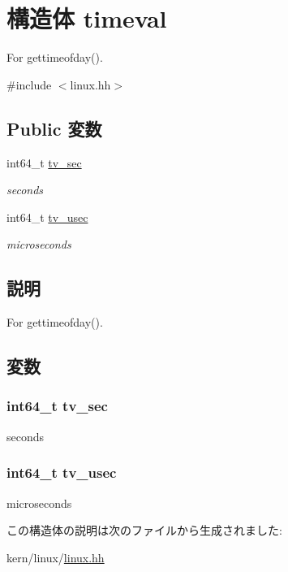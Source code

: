 \hypertarget{structLinux_1_1timeval}{
\section{構造体 timeval}
\label{structLinux_1_1timeval}
}


For gettimeofday().  


{\ttfamily \#include $<$linux.hh$>$}\subsection*{Public 変数}
\begin{DoxyCompactItemize}
\item 
int64\_\-t \hyperlink{structLinux_1_1timeval_ade91ea7e70df7db611d15bdda30a6dd9}{tv\_\-sec}
\begin{DoxyCompactList}\small\item\em seconds \item\end{DoxyCompactList}\item 
int64\_\-t \hyperlink{structLinux_1_1timeval_a73863c3643de3f79fefa8b4d6d3cfaa8}{tv\_\-usec}
\begin{DoxyCompactList}\small\item\em microseconds \item\end{DoxyCompactList}\end{DoxyCompactItemize}


\subsection{説明}
For gettimeofday(). 

\subsection{変数}
\hypertarget{structLinux_1_1timeval_ade91ea7e70df7db611d15bdda30a6dd9}{
\subsubsection[{tv\_\-sec}]{\setlength{\rightskip}{0pt plus 5cm}int64\_\-t {\bf tv\_\-sec}}}
\label{structLinux_1_1timeval_ade91ea7e70df7db611d15bdda30a6dd9}


seconds \hypertarget{structLinux_1_1timeval_a73863c3643de3f79fefa8b4d6d3cfaa8}{
\subsubsection[{tv\_\-usec}]{\setlength{\rightskip}{0pt plus 5cm}int64\_\-t {\bf tv\_\-usec}}}
\label{structLinux_1_1timeval_a73863c3643de3f79fefa8b4d6d3cfaa8}


microseconds 

この構造体の説明は次のファイルから生成されました:\begin{DoxyCompactItemize}
\item 
kern/linux/\hyperlink{kern_2linux_2linux_8hh}{linux.hh}\end{DoxyCompactItemize}

